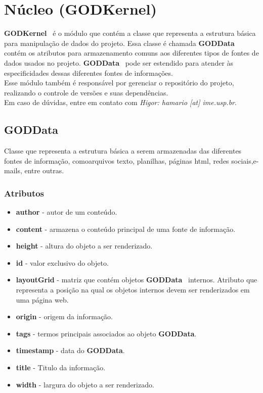 \def\godkernel{\textbf{GODKernel}}
\def\goddata{\textbf{GODData}}
\def\configGod{\textbf{ConfigurationOfGOD}}

\section{Núcleo (\godkernel)}

\godkernel~ é o módulo que contém a classe que representa a estrutura básica para manipulação de dados do projeto.
Essa classe é chamada \goddata~ contém os atributos para armazenamento comuns aos diferentes tipos de fontes de dados usados no projeto. 
\goddata~ pode ser estendido para atender às especificidades dessas diferentes fontes de informações.\\
Esse módulo também é responsável por gerenciar o repositório do projeto, realizando o controle de versões e suas dependências.\\
Em caso de dúvidas, entre em contato com \emph{Higor: hamario [at] ime.usp.br}.


\subsection{\goddata} 

Classe que representa a estrutura básica a serem armazenadas das diferentes fontes de informação, comoarquivos texto, planilhas, páginas html, redes sociais,e-mails, entre outras.

\subsubsection{Atributos}

\begin{itemize}
 \item \textbf{author} - autor de um conteúdo.
 \item \textbf{content} - armazena o conteúdo principal de uma fonte de informação.
 \item \textbf{height} - altura do objeto a ser renderizado.
 \item \textbf{id} - valor exclusivo do objeto.
 \item \textbf{layoutGrid} - matriz que contém objetos \goddata~ internos. Atributo que representa a posição na qual os objetos internos devem ser renderizados em uma página web.
 \item \textbf{origin} - origem da informação.
 \item \textbf{tags} - termos principais associados ao objeto \goddata.
 \item \textbf{timestamp} - data do \goddata.
 \item \textbf{title} - Titulo da informação.
 \item \textbf{width} - largura do objeto a ser renderizado.
\end{itemize}


